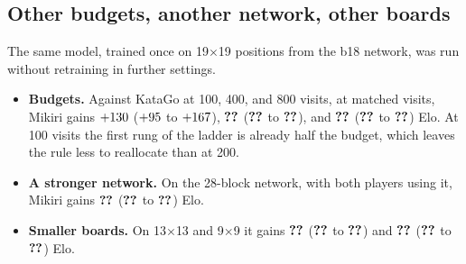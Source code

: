 \subsection{Other budgets, another network, other boards}

The same model, trained once on 19$\times$19 positions from the b18 network, was run without retraining in further settings.
\begin{itemize}
\item \textbf{Budgets.} Against KataGo at 100, 400, and 800 visits, at matched visits, Mikiri gains $+130$ ($+95$ to $+167$), $\textbf{??}$ ($\textbf{??}$ to $\textbf{??}$), and $\textbf{??}$ ($\textbf{??}$ to $\textbf{??}$) Elo. At 100 visits the first rung of the ladder is already half the budget, which leaves the rule less to reallocate than at 200.
\item \textbf{A stronger network.} On the 28-block network, with both players using it, Mikiri gains $\textbf{??}$ ($\textbf{??}$ to $\textbf{??}$) Elo.
\item \textbf{Smaller boards.} On 13$\times$13 and 9$\times$9 it gains $\textbf{??}$ ($\textbf{??}$ to $\textbf{??}$) and $\textbf{??}$ ($\textbf{??}$ to $\textbf{??}$) Elo.
\end{itemize}
